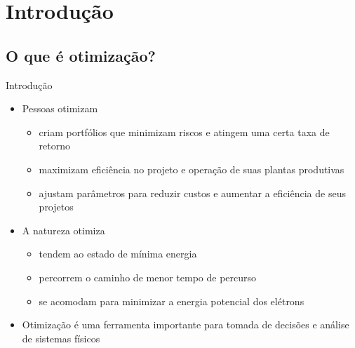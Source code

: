 \section{Introdução}

\subsection{O que é otimização?}

\begin{frame}{Introdução~\cite{Nocedal2006}}
  \begin{itemize}\addtolength{\itemsep}{\baselineskip}
    \item Pessoas otimizam
    \begin{itemize}
    \item {}  criam portfólios que minimizam riscos e atingem uma certa taxa
      de retorno
    \item {}  maximizam eficiência no projeto e operação de suas plantas
      produtivas
    \item {}  ajustam parâmetros para reduzir custos e aumentar a eficiência
      de seus projetos
    \end{itemize}

    \item A natureza otimiza
    \begin{itemize}
      \item {}  tendem ao estado de mínima energia
      \item {}  percorrem o caminho de menor tempo de percurso
      \item {}  se acomodam para minimizar a energia potencial dos elétrons
    \end{itemize}

    \item Otimização é uma ferramenta importante para tomada de decisões e análise de sistemas físicos
  \end{itemize}
\end{frame}

